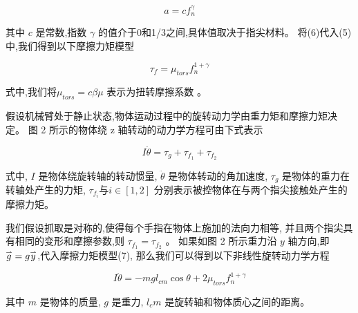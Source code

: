 \vspace{-15pt}
\begin{equation}
  a = cf_n^\gamma
\end{equation}

\noindent 其中 $c$ 是常数,指数 $\gamma$ 的值介于0和1/3之间,具体值取决于指尖材料。
将(6)代入(5)中,我们得到以下摩擦力矩模型

\vspace{-15pt}
\begin{equation}
  {\tau _f} = {\mu _{tors}}f_n^{1 + \gamma }
\end{equation}

式中,我们将${\mu _{tors}} = c\beta \mu $ 表示为扭转摩擦系数 。




假设机械臂处于静止状态,物体运动过程中的旋转动力学由重力矩和摩擦力矩决定。
图 2 所示的物体绕 z 轴转动的动力学方程可由下式表示

\vspace{-15pt}
\begin{equation}
  I\ddot \theta  = {\tau _g} + {\tau _{{f_1}}} + {\tau _{{f_2}}}
\end{equation}

\noindent 式中, $I$ 是物体绕旋转轴的转动惯量, $\ddot \theta$ 是物体转动的角加速度,
$\tau_g$ 是物体的重力在转轴处产生的力矩,
${\tau _{{f_i}}}$与$i \in \left[ {1,2} \right ]$
分别表示被控物体在与两个指尖接触处产生的摩擦力矩。

我们假设抓取是对称的,使得每个手指在物体上施加的法向力相等,
并且两个指尖具有相同的变形和摩擦参数,则 ${\tau _{{f_1}}} = {\tau _{{f_2}}}$ 。
如果如图 2 所示重力沿 $y$ 轴方向,即
$\mathord{\buildrel{\lower3pt\hbox{$\scriptscriptstyle\rightharpoonup$}}
  \over g}  = g\mathord{\buildrel{\lower3pt\hbox{$\scriptscriptstyle\rightharpoonup$}}
\over y} $,代入摩擦力矩模型(7),
那么我们可以得到以下非线性旋转动力学方程

\vspace{-15pt}
\begin{equation}
  I\ddot \theta  =  - mg{l_{cm}}\cos \theta  + 2{\mu _{tors}}f_n^{1 + \gamma }
\end{equation}

\noindent 其中 $m$ 是物体的质量, $g$ 是重力, $l_cm$ 是旋转轴和物体质心之间的距离。

